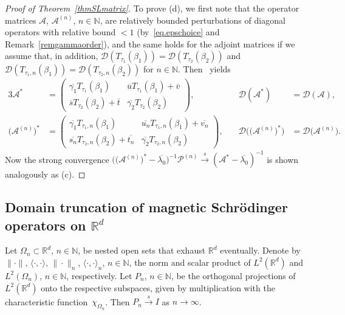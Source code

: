 \documentclass[a4paper,reqno]{amsart}
\begin{document}
\begin{proof}[Proof of Theorem~{\rm\ref{thmSLmatrix}}]
To prove (d), we first note that the operator matrices ${\mathcal A}$, ${\mathcal A}^{(n)}$, $n\in{\mathbb{N}}$, are relatively bounded perturbations of diagonal operators with relative bound $<1$ (by~\eqref{eq.epschoice} and Remark~\ref{remgammaorder}), and the same holds for the adjoint matrices if we assume that, in addition, ${\mathcal D}(T_{\tau_1}(\beta_1))={\mathcal D}(T_{\tau_2}(\beta_2))$ and  ${\mathcal D}(T_{\tau_1,n}(\beta_1))={\mathcal D}(T_{\tau_2,n}(\beta_2))$ for $n\in{\mathbb{N}}$. Then~\cite[Corollary~1]{Hess-Kato} yields 
\begin{alignat*}{3}
{\mathcal A}^*&=\begin{pmatrix} \overline{\gamma_1} T_{\tau_1}(\beta_1) & \overline{u} T_{\tau_1}(\beta_1)+\overline{v}\\  \overline{s} T_{\tau_2}(\beta_2)+\overline{t} & \overline{\gamma_2} T_{\tau_2}(\beta_2)\end{pmatrix}, \quad& {\mathcal D}({\mathcal A}^*)&={\mathcal D}({\mathcal A}),\\
\big({\mathcal A}^{(n)}\big)^*&=\begin{pmatrix} \overline{\gamma_1} T_{\tau_1,n}(\beta_1) & \overline{u_n} T_{\tau_1,n}(\beta_1)+\overline{v_n}\\ \overline{s_n} T_{\tau_2,n}(\beta_2)+\overline{t_n} & \overline{\gamma_2} T_{\tau_2,n}(\beta_2)\end{pmatrix}, \quad&
{\mathcal D}\big(\big({\mathcal A}^{(n)}\big)^*\big)&={\mathcal D}\big({\mathcal A}^{(n)}\big).
\end{alignat*}
Now the strong convergence $\big(\big({\mathcal A}^{(n)}\big)^*-\overline{\lambda_0}\big)^{-1}{\mathcal P}^{(n)}{\stackrel{s}{\rightarrow}} ({\mathcal A}^*-\overline{\lambda_0})^{-1}$ is shown analogously as (c).
\end{proof}

\subsection{Domain truncation of magnetic Schr\"odinger operators on ${\mathbb{R}}^d$}
Let $\Omega_n\subset {\mathbb{R}}^d$, $n\in{\mathbb{N}}$, be nested open sets that exhaust ${\mathbb{R}}^d$ eventually.
Denote by $\|\cdot\|$, $\langle\cdot,\cdot\rangle$, $\|\cdot\|_n$, $\langle\cdot,\cdot\rangle_n$, $n\in{\mathbb{N}}$, the norm and scalar product of $L^2({\mathbb{R}}^d)$ and $L^2(\Omega_n)$, $n\in{\mathbb{N}}$, respectively.
Let $P_n$, $n\in{\mathbb{N}}$, be the orthogonal projections of $L^2({\mathbb{R}}^d)$ onto the respective subspaces, 
given by multiplication with the characteristic function~$\chi_{\Omega_n}$.
Then $P_n{\stackrel{s}{\rightarrow}} I$ as $n\to\infty$.
\end{document}
